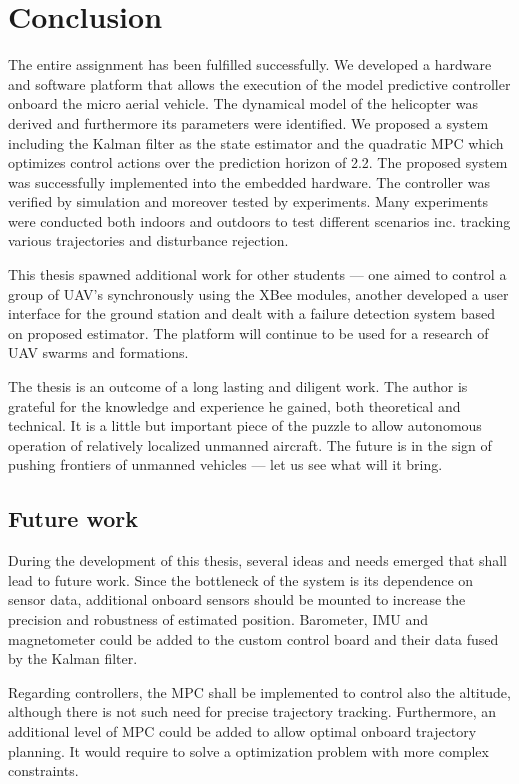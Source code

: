 \section{Conclusion}

The entire assignment has been fulfilled successfully. We developed a hardware and software platform that allows the execution of the model predictive controller onboard the micro aerial vehicle. The dynamical model of the helicopter was derived and furthermore its parameters were identified. We proposed a system including the Kalman filter as the state estimator and the quadratic MPC which optimizes control actions over the prediction horizon of 2.2. The proposed system was successfully implemented into the embedded hardware. The controller was verified by simulation and moreover tested by experiments. Many experiments were conducted both indoors and outdoors to test different scenarios inc. tracking various trajectories and disturbance rejection.

This thesis spawned additional work for other students \citep{klucka2015, fiedler2015} --- one aimed to control a group of UAV's synchronously using the XBee modules, another developed a user interface for the ground station and dealt with a failure detection system based on proposed estimator. The platform will continue to be used for  a research of UAV swarms and formations. 

The thesis is an outcome of a long lasting and diligent work. The author is grateful for the knowledge and experience he gained, both theoretical and technical. It is a little but important piece of the puzzle to allow autonomous operation of relatively localized unmanned aircraft. The future is in the sign of pushing frontiers of unmanned vehicles --- let us see what will it bring.

\subsection{Future work}

During the development of this thesis, several ideas and needs emerged that shall lead to future work. Since the bottleneck of the system is its dependence on sensor data, additional onboard sensors should be mounted to increase the precision and robustness of estimated position. Barometer, IMU and magnetometer could be added to the custom control board and their data fused by the Kalman filter.

Regarding controllers, the MPC shall be implemented to control also the altitude, although there is not such need for precise trajectory tracking. Furthermore, an additional level of MPC could be added to allow optimal onboard trajectory planning. It would require to solve a optimization problem with more complex constraints. 
